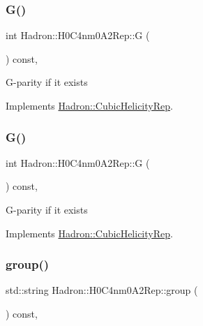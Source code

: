 \subsubsection{\texorpdfstring{G()}{G()}\hspace{0.1cm}{\footnotesize\ttfamily [1/2]}}
{\footnotesize\ttfamily int Hadron\+::\+H0\+C4nm0\+A2\+Rep\+::G (\begin{DoxyParamCaption}{ }\end{DoxyParamCaption}) const\hspace{0.3cm}{\ttfamily [inline]}, {\ttfamily [virtual]}}

G-\/parity if it exists 

Implements \mbox{\hyperlink{structHadron_1_1CubicHelicityRep_a50689f42be1e6170aa8cf6ad0597018b}{Hadron\+::\+Cubic\+Helicity\+Rep}}.

\mbox{\label{structHadron_1_1H0C4nm0A2Rep_a41606c0da3afeabfdf9b865c3335b117}} 
\subsubsection{\texorpdfstring{G()}{G()}\hspace{0.1cm}{\footnotesize\ttfamily [2/2]}}
{\footnotesize\ttfamily int Hadron\+::\+H0\+C4nm0\+A2\+Rep\+::G (\begin{DoxyParamCaption}{ }\end{DoxyParamCaption}) const\hspace{0.3cm}{\ttfamily [inline]}, {\ttfamily [virtual]}}

G-\/parity if it exists 

Implements \mbox{\hyperlink{structHadron_1_1CubicHelicityRep_a50689f42be1e6170aa8cf6ad0597018b}{Hadron\+::\+Cubic\+Helicity\+Rep}}.

\mbox{\label{structHadron_1_1H0C4nm0A2Rep_aef42f0970df5b016741ddfeccf659871}} 
\subsubsection{\texorpdfstring{group()}{group()}\hspace{0.1cm}{\footnotesize\ttfamily [1/3]}}
{\footnotesize\ttfamily std\+::string Hadron\+::\+H0\+C4nm0\+A2\+Rep\+::group (\begin{DoxyParamCaption}{ }\end{DoxyParamCaption}) const\hspace{0.3cm}{\ttfamily [inline]}, {\ttfamily [virtual]}}

